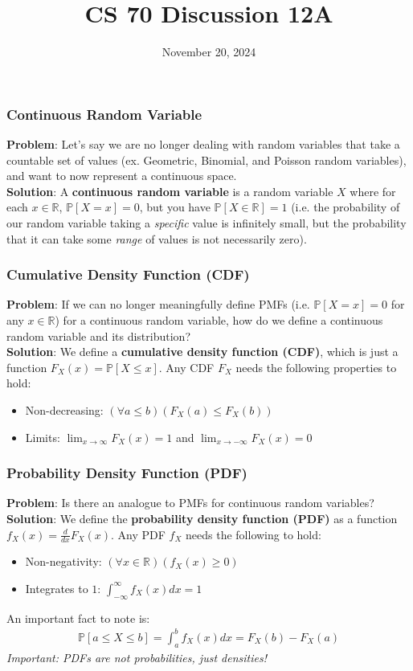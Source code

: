 \documentclass{beamer}
\title{CS 70 Discussion 12A}
\date{November 20, 2024}
\begin{document}
\frame{\titlepage}

\begin{frame}
    \frametitle{Continuous Random Variable}
    {\bf Problem}: Let's say we are no longer dealing with random variables that take a countable set of values (ex. Geometric, Binomial, and Poisson random variables), and want to now represent a continuous space.\\
    {\bf Solution}: A {\bf continuous random variable} is a random variable $X$ where for each $x\in\mathbb{R}$, $\mathbb{P}[X=x]=0$, but you have $\mathbb{P}[X\in\mathbb{R}]=1$ (i.e. the probability of our random variable taking a {\it specific} value is infinitely small, but the probability that it can take some {\it range} of values is not necessarily zero).
\end{frame}

\begin{frame}
    \frametitle{Cumulative Density Function (CDF)}
    {\bf Problem}: If we can no longer meaningfully define PMFs (i.e. $\mathbb{P}[X=x]=0$ for any $x\in\mathbb{R}$) for a continuous random variable, how do we define a continuous random variable and its distribution?\\
    {\bf Solution}: We define a {\bf cumulative density function (CDF)}, which is just a function $F_X(x)=\mathbb{P}[X\leq x]$. Any CDF $F_X$ needs the following properties to hold:
    \begin{itemize}
        \item Non-decreasing: $(\forall a\leq b)(F_X(a)\leq F_X(b))$
        \item Limits: $\lim_{x\rightarrow\infty}F_X(x)=1$ and $\lim_{x\rightarrow-\infty}F_X(x)=0$
    \end{itemize}
\end{frame}

\begin{frame}
    \frametitle{Probability Density Function (PDF)}
    {\bf Problem}: Is there an analogue to PMFs for continuous random variables?\\
    {\bf Solution}: We define the {\bf probability density function (PDF)} as a function $f_X(x)=\frac{d}{dx}F_X(x)$. Any PDF $f_X$ needs the following to hold:
    \begin{itemize}
        \item Non-negativity: $(\forall x\in\mathbb{R})(f_X(x)\geq 0)$
        \item Integrates to $1$: $\int_{-\infty}^\infty f_X(x)dx=1$
    \end{itemize}
    An important fact to note is:
    \begin{align*}
        \mathbb{P}[a\leq X\leq b]=\int_a^bf_X(x)dx=F_X(b)-F_X(a)
    \end{align*}
    {\it Important: PDFs are not probabilities, just densities!}
\end{frame}
\end{document}
